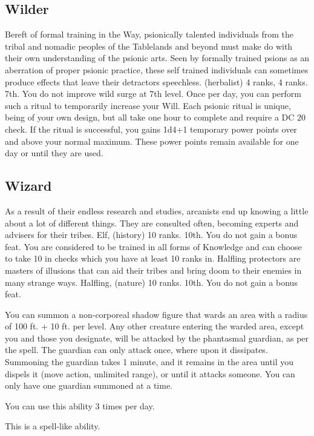
\subsection{Wilder}
{Bereft of formal training in the Way, psionically talented individuals from the tribal and nomadic peoples of the Tablelands and beyond must make do with their own understanding of the psionic arts. Seen by formally trained psions as an aberration of proper psionic practice, these self trained individuals can sometimes produce effects that leave their detractors speechless.}
{ (herbalist) 4 ranks,  4 ranks.}
{7th.}
{You do not improve wild surge at 7th level.}
{
	Once per day, you can perform such a ritual to temporarily increase your Will. Each psionic ritual is unique, being of your own design, but all take one hour to complete and require a DC 20  check. If the ritual is successful, you gains 1d4+1 temporary power points over and above your normal maximum. These power points remain available for one day or until they are used.
}

\subsection{Wizard}
{As a result of their endless research and studies, arcanists end up knowing a little about a lot of different things. They are consulted often, becoming experts and advisers for their tribes.}
{Elf,  (history) 10 ranks.}
{10th.}
{You do not gain a bonus feat.}
{
	You are considered to be trained in all forms of Knowledge and can choose to take 10 in  checks which you have at least 10 ranks in.
}
{Halfling protectors are masters of illusions that can aid their tribes and bring doom to their enemies in many strange ways.}
{Halfling,  (nature) 10 ranks.}
{10th.}
{You do not gain a bonus feat.}
{
	You can summon a non-corporeal shadow figure that wards an area with a radius of 100 ft. + 10 ft. per level. Any other creature entering the warded area, except you and those you designate, will be attacked by the phantasmal guardian, as per the  spell. The guardian can only attack once, where upon it dissipates. Summoning the guardian takes 1 minute, and it remains in the area until you dispels it (move action, unlimited range), or until it attacks someone. You can only have one guardian summoned at a time.

	You can use this ability 3 times per day.

	This is a spell-like ability.
}